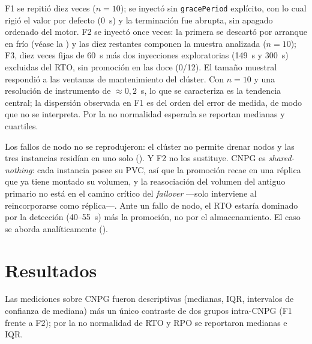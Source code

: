 F1 se repitió diez veces ($n=10$); se inyectó sin \texttt{gracePeriod} explícito, con lo cual rigió el valor por defecto (0~s) y la terminación fue abrupta, sin apagado ordenado del motor. F2 se inyectó once veces: la primera se descartó por arranque en frío (véase la ) y las diez restantes componen la muestra analizada ($n=10$); F3, diez veces fijas de 60~s más dos inyecciones exploratorias (149~s y 300~s) excluidas del RTO, sin promoción en las doce (0/12). El tamaño muestral respondió a las ventanas de mantenimiento del clúster. Con $n=10$ y una resolución de instrumento de $\approx0{,}2$~s, lo que se caracteriza es la tendencia central; la dispersión observada en F1 es del orden del error de medida, de modo que no se interpreta. Por la no normalidad esperada se reportan medianas y cuartiles.

Los fallos de nodo no se reprodujeron: el clúster no permite drenar nodos y las tres instancias residían en uno solo (). Y F2 no los sustituye. CNPG es \emph{shared-nothing}: cada instancia posee su PVC, así que la promoción recae en una réplica que ya tiene montado su volumen, y la reasociación del volumen del antiguo primario no está en el camino crítico del \textit{failover} —solo interviene al reincorporarse como réplica—. Ante un fallo de nodo, el RTO estaría dominado por la detección (40--55~s) más la promoción, no por el almacenamiento. El caso se aborda analíticamente ().

\section{Resultados}\label{sec:res}
Las mediciones sobre CNPG fueron descriptivas (medianas, IQR, intervalos de confianza de mediana) más un único contraste de dos grupos intra-CNPG (F1 frente a F2); por la no normalidad de RTO y RPO se reportaron medianas e IQR.


